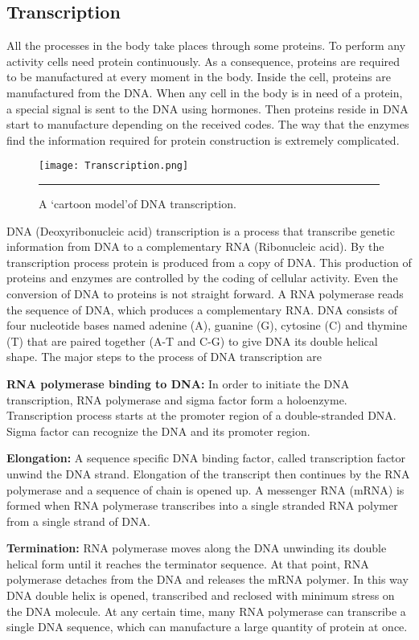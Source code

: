 \subsection{Transcription}
All the processes in the body take places through some proteins. To perform any activity cells need protein continuously. As a consequence, proteins are required to be manufactured at every moment in the body. Inside the cell, proteins are manufactured from the DNA. When any cell in the body is in need of a protein, a special signal is sent to the DNA using hormones. Then proteins reside in DNA start to manufacture depending on the received codes. The way that the enzymes find the information required for protein construction is extremely complicated.

\begin{figure}%
	\centering
		 \texttt{[image: Transcription.png]} 
		\rule{35em}{0.5pt}
	\caption{A \lq cartoon model\rq of DNA transcription.}
	\label{fig:transcription}
\end{figure}

DNA (Deoxyribonucleic acid) transcription is a process that transcribe genetic information from DNA to a complementary RNA (Ribonucleic acid). By the transcription process protein is produced from a copy of DNA. This production of proteins and enzymes are controlled by the coding of cellular activity. Even the conversion of DNA to proteins is not straight forward. A RNA polymerase reads the sequence of DNA, which produces a complementary RNA. DNA consists of four nucleotide bases named adenine (A), guanine (G), cytosine (C) and thymine (T) that are paired together (A-T and C-G) to give DNA its double helical shape. The major steps to the process of DNA transcription are

\textbf{RNA polymerase binding to DNA:} In order to initiate the DNA transcription, RNA polymerase and sigma factor form a holoenzyme. Transcription process starts at the promoter region of a double-stranded DNA. Sigma factor can recognize the DNA and its promoter region. 

\textbf{Elongation:} A sequence specific DNA binding factor, called transcription factor unwind the DNA strand. Elongation of the transcript then continues by the RNA polymerase and a sequence of chain is opened up. A messenger RNA (mRNA) is formed when RNA polymerase transcribes into a single stranded RNA polymer from a single strand of DNA.

\textbf{Termination:} RNA polymerase moves along the DNA unwinding its double helical form until it reaches the terminator sequence. At that point, RNA polymerase detaches from the DNA and releases the mRNA polymer. In this way DNA double helix is opened, transcribed and reclosed with minimum stress on the DNA molecule. At any certain time, many RNA polymerase can transcribe a single DNA sequence, which can manufacture a large quantity of protein at once. 

